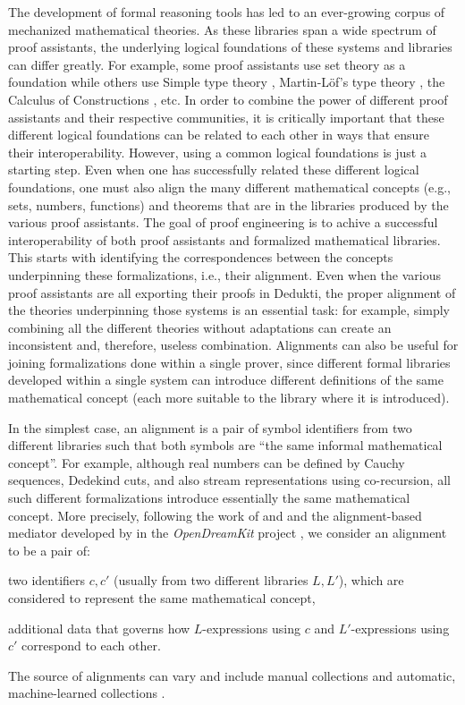 The development of formal reasoning tools has led to an ever-growing
corpus of mechanized mathematical theories. As these libraries span a
wide spectrum of proof assistants, the underlying logical foundations
of these systems and libraries can differ greatly. For example, some
proof assistants use set theory as a foundation while others use
Simple type theory \cite{Church40}, Martin-L\"of's type theory
\cite{Martin-Lof84}, the Calculus of Constructions
\cite{CoquandHuet88}, etc.  In order to combine the power of different
proof assistants and their respective communities, it is critically
important that these different logical foundations can be related to
each other in ways that ensure their interoperability. However, using
a common logical foundations is just a starting step. Even when one
has successfully related these different logical foundations, one must
also align the many different mathematical concepts (e.g., sets,
numbers, functions) and theorems that are in the libraries produced by
the various proof assistants. The goal of proof engineering is to
achive a successful interoperability of both proof assistants and
formalized mathematical libraries. This starts with identifying the
correspondences between the concepts underpinning these
formalizations, i.e., their alignment. Even when the various proof
assistants are all exporting their proofs in Dedukti, the proper
alignment of the theories underpinning those systems is an essential
task: for example, simply combining all the different theories without
adaptations can create an inconsistent and, therefore, useless
combination.
%
Alignments can also be useful for joining formalizations done within a
single prover, since different formal libraries developed within a
single system can introduce different definitions of the same
mathematical concept (each more suitable to the library where it is
introduced).

In the simplest case, an alignment is a pair of symbol identifiers
from two different libraries such that both symbols are ``the same
informal mathematical concept''. For example, although real numbers
can be defined by Cauchy sequences, Dedekind cuts, and also stream
representations using co-recursion, all such different formalizations
introduce essentially the same mathematical concept. More precisely,
following the work of  and 
\cite{GKKMR:alignments:17} and the alignment-based mediator developed
by  in the {\em OpenDreamKit} project \cite{DBLP:conf/mkm/DehayeIKKLMPRTW16}, we
consider an alignment to be a pair of:
\begin{compactitem}
  \item two identifiers $c,c'$ (usually from two different libraries
    $L,L'$), which are considered to represent the same mathematical
    concept,
  \item additional data that governs how $L$-expressions using $c$ and
    $L'$-expressions using $c'$ correspond to each other.
\end{compactitem}
The source of alignments can vary and include manual collections
\cite{MRLR:alignments:17} and automatic, machine-learned collections
\cite{GAUTHIER201989}.

